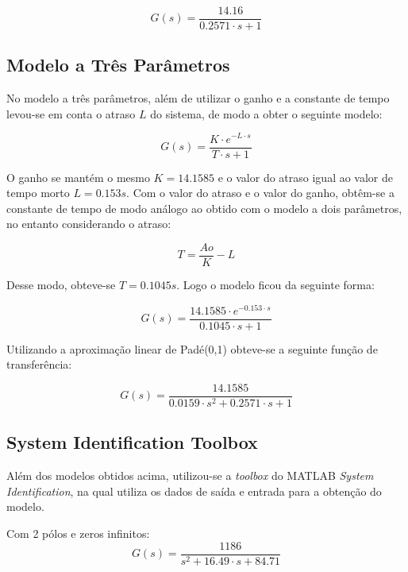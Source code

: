 \documentclass{article}
\begin{document}
\begin{equation}
    G(s) = \frac{14.16}{0.2571 \cdot s + 1}
\end{equation}


\subsection{Modelo a Três Parâmetros}
No modelo a três parâmetros, além de utilizar o ganho e a constante de tempo levou-se em conta o atraso $L$ do sistema, de modo a obter o seguinte modelo:

\begin{equation}
    G(s) = \frac{K \cdot e^{-L \cdot s\!}}{T \cdot s + 1}
\end{equation}

O ganho se mantém o mesmo $K = 14.1585$ e o valor do atraso igual ao valor de tempo morto $L = 0.153 s$. Com o valor do atraso e o valor do ganho, obtêm-se a constante de tempo de modo análogo ao obtido com o modelo a dois parâmetros, no entanto considerando o atraso:

\begin{equation}
    T = \frac{Ao}{K} - {L}
\end{equation}

Desse modo, obteve-se $T = 0.1045 s$. Logo o modelo ficou da seguinte forma:

\begin{equation}
    G(s) = \frac{14.1585 \cdot e^{-0.153 \cdot s\!}}{0.1045 \cdot s + 1}
\end{equation}

Utilizando a aproximação linear de Padé(0,1) obteve-se a seguinte função de transferência:

\begin{equation}
    G(s) = \frac{14.1585}{0.0159 \cdot s^{2\!} + 0.2571 \cdot s + 1}
\end{equation}


\subsection{System Identification Toolbox}
Além dos modelos obtidos acima, utilizou-se a \textit{toolbox} do MATLAB \textit{System Identification}, na qual utiliza os dados de saída e entrada para a obtenção do modelo.

Com 2 pólos e zeros infinitos:
\begin{equation}
    G(s) = \frac{1186}{s^{2\!} + 16.49 \cdot s + 84.71}
\end{equation}
\end{document}
